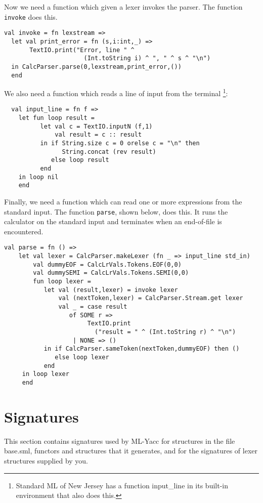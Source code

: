 \documentclass{article}
\begin{document}
Now we need a function which given a lexer invokes the parser.  The
function {\tt invoke} does this.

\begin{verbatim}
val invoke = fn lexstream =>
  let val print_error = fn (s,i:int,_) =>
       TextIO.print("Error, line " ^
                      (Int.toString i) ^ ", " ^ s ^ "\n")
  in CalcParser.parse(0,lexstream,print_error,())
  end
\end{verbatim}

We also need a function which reads a line of input from the terminal
\footnote{Standard ML of New Jersey has a function input\_line in its
built-in environment that also does this.}:
\begin{verbatim}
  val input_line = fn f =>
    let fun loop result =
          let val c = TextIO.inputN (f,1)
              val result = c :: result
          in if String.size c = 0 orelse c = "\n" then
                String.concat (rev result)
             else loop result
          end
    in loop nil
    end
\end{verbatim}

Finally, we need a function which can read one or more expressions from
the standard input.  The function {\tt parse}, shown below, does this.
It runs the calculator on the standard input and terminates 
when an end-of-file is encountered.

\begin{verbatim}
val parse = fn () => 
    let val lexer = CalcParser.makeLexer (fn _ => input_line std_in)
        val dummyEOF = CalcLrVals.Tokens.EOF(0,0)
        val dummySEMI = CalcLrVals.Tokens.SEMI(0,0)
        fun loop lexer =
           let val (result,lexer) = invoke lexer
               val (nextToken,lexer) = CalcParser.Stream.get lexer
               val _ = case result
                  of SOME r =>
                       TextIO.print
                         ("result = " ^ (Int.toString r) ^ "\n")
                   | NONE => ()
           in if CalcParser.sameToken(nextToken,dummyEOF) then ()
              else loop lexer
           end
     in loop lexer
     end
\end{verbatim}

\section{Signatures}

This section contains signatures used by ML-Yacc for structures in
the file base.sml, functors and structures that it generates, and for
the signatures of lexer structures supplied by you.
\end{document}
